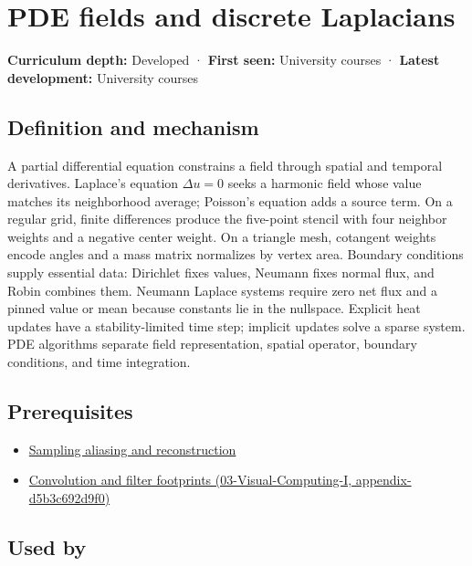 \hypertarget{appendix-1988d465c119}{}
\section{PDE fields and discrete Laplacians}\label{appendix-1988d465c119-pde-fields-and-discrete-laplacians}

\textbf{Curriculum depth:} Developed · \textbf{First seen:} University courses · \textbf{Latest development:} University courses

\subsection{Definition and mechanism}\label{appendix-1988d465c119-definition-and-mechanism}

A partial differential equation constrains a field through spatial and temporal derivatives. Laplace's equation \(\Delta u=0\) seeks a harmonic field whose value matches its neighborhood average; Poisson's equation adds a source term. On a regular grid, finite differences produce the five-point stencil with four neighbor weights and a negative center weight. On a triangle mesh, cotangent weights encode angles and a mass matrix normalizes by vertex area. Boundary conditions supply essential data: Dirichlet fixes values, Neumann fixes normal flux, and Robin combines them. Neumann Laplace systems require zero net flux and a pinned value or mean because constants lie in the nullspace. Explicit heat updates have a stability-limited time step; implicit updates solve a sparse system. PDE algorithms separate field representation, spatial operator, boundary conditions, and time integration.

\subsection{Prerequisites}\label{appendix-1988d465c119-prerequisites}

\begin{itemize}
\tightlist
\item
  \hyperref[appendix-6a7869dd79a6]{Sampling aliasing and reconstruction}
\item
  \href{../03-Visual-Computing-I/main.pdf\#nameddest=appendix-d5b3c692d9f0}{Convolution and filter footprints (03-Visual-Computing-I, appendix-d5b3c692d9f0)}
\end{itemize}

\subsection{Used by}\label{appendix-1988d465c119-used-by}

